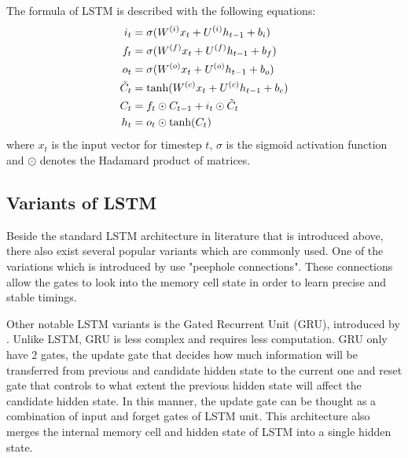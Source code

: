 \documentclass[12pt]{extarticle}
\begin{document}
The formula of LSTM is described with the following equations:
\begin{align}
i_{t} &= \sigma(W^{(i)}x_{t} + U^{(i)}h_{t-1} + b_{i}) \\
f_{t} &= \sigma(W^{(f)}x_{t} + U^{(f)}h_{t-1} + b_{f}) \\
o_{t} &= \sigma(W^{(o)}x_{t} + U^{(o)}h_{t-1} + b_{o}) \\
\tilde{C}_{t} &= \textnormal{tanh}(W^{(c)}x_{t} + U^{(c)}h_{t-1} + b_{c}) \\
C_{t} &= f_{t} \odot C_{t-1} + i_{t} \odot \tilde{C}_{t} \\
h_{t} &= o_{t} \odot \textnormal{tanh}(C_{t})
\end{align}
where $x_{t}$ is the input vector for timestep $t$, $\sigma$ is the sigmoid activation function and $\odot$ denotes the Hadamard product of matrices. 

\subsection*{Variants of LSTM}
Beside the standard LSTM architecture in literature that is introduced above, there also exist several popular variants which are commonly used. One of the variations which is introduced by \citep{DBLP:conf/ijcnn/GersS00} use "peephole connections". These connections allow the gates to look into the memory cell state in order to learn precise and stable timings. 

Other notable LSTM variants is the Gated Recurrent Unit (GRU), introduced by \citep{cho-etal-2014-learning}. Unlike LSTM, GRU is less complex and requires less computation. GRU only have 2 gates, the update gate that decides how much information will be transferred from previous and candidate hidden state to the current one and reset gate that controls to what extent the previous hidden state will affect the candidate hidden state. In this manner, the update gate can be thought as a combination of input and forget gates of LSTM unit. This architecture also merges the internal memory cell and hidden state of LSTM into a single hidden state.

\end{document}
